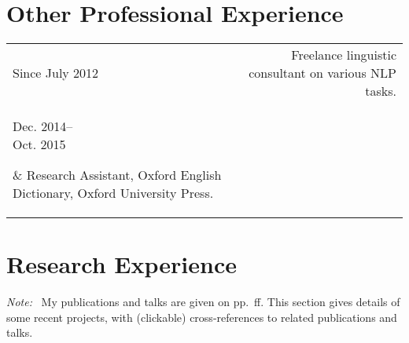 \documentclass[11pt,a4paper]{article}
\makeatletter
\newcommand{\datewidth}{0.15}
\newenvironment{cvsection}{%
  \setlength{\extrarowheight}{0.70ex}
  \begin{longtable}[l]{@{} L R @{}}
}{%
  \end{longtable}
}
\newcommand{\note}{\emph{Note: }}
\newcommand{\longdate}[1]{\parbox[t]{\datewidth\textwidth}{\raggedleft
#1}}
\makeatother
\begin{document}

\section*{Other Professional Experience}

\begin{cvsection}
  Since July 2012	& Freelance linguistic consultant on various NLP tasks.\\
  \longdate{Dec. 2014--\\[-0.5em] Oct. 2015}
  & Research Assistant, Oxford English Dictionary, Oxford University Press.\\
\end{cvsection}

\newpage

\section*{Research Experience}

\note\ My publications and talks are given on pp.~\pageref{scholarship}ff. This section gives details of some recent projects, with (clickable) cross-references to related publications and talks.\\
\end{document}
